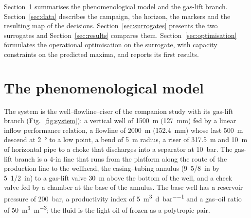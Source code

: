 \documentclass[a4paper,fleqn]{cas-sc}
\begin{document}
Section~\ref{sec:model} summarises the phenomenological model and the gas-lift branch. Section~\ref{sec:data} describes the campaign, the horizon, the markers and the resulting map of the decisions. Section~\ref{sec:surrogates} presents the two surrogates and Section~\ref{sec:results} compares them. Section~\ref{sec:optimisation} formulates the operational optimisation on the surrogate, with capacity constraints on the predicted maxima, and reports its first results.

\section{The phenomenological model}\label{sec:model}

The system is the well--flowline--riser of the companion study \citep{souza2026a} with its gas-lift branch (Fig.~\ref{fig:system}): a vertical well of \SI{1500}{\metre} (\SI{127}{\milli\metre}) fed by a linear inflow performance relation, a flowline of \SI{2000}{\metre} (\SI{152.4}{\milli\metre}) whose last \SI{500}{\metre} descend at \SI{2}{\degree} to a low point, a bend of \SI{5}{\metre} radius, a riser of \SI{317.5}{\metre} and \SI{10}{\metre} of horizontal pipe to a choke that discharges into a separator at \SI{10}{\bar}. The gas-lift branch is a 4-in line that runs from the platform along the route of the production line to the wellhead, the casing--tubing annulus (9~5/8~in by 5~1/2~in) to a gas-lift valve \SI{30}{\metre} above the bottom of the well, and a check valve fed by a chamber at the base of the annulus. The base well has a reservoir pressure of \SI{200}{\bar}, a productivity index of \SI{5}{\cubic\metre\per\day\per\bar} and a gas--oil ratio of \SI{50}{\cubic\metre\per\cubic\metre}; the fluid is the light oil of \citet{carvalho2022} frozen as a polytropic pair.
\end{document}
